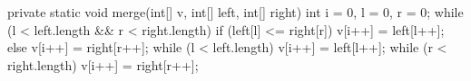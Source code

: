 \begin{unipdcode}[language=Java]
private static void merge(int[] v, int[] left, int[] right) {
    int i = 0, l = 0, r = 0;
    while (l < left.length && r < right.length) {
        if (left[l] <= right[r]) v[i++] = left[l++];
        else v[i++] = right[r++];
    }
    while (l < left.length) v[i++] = left[l++];
    while (r < right.length) v[i++] = right[r++];
}
\end{unipdcode}

